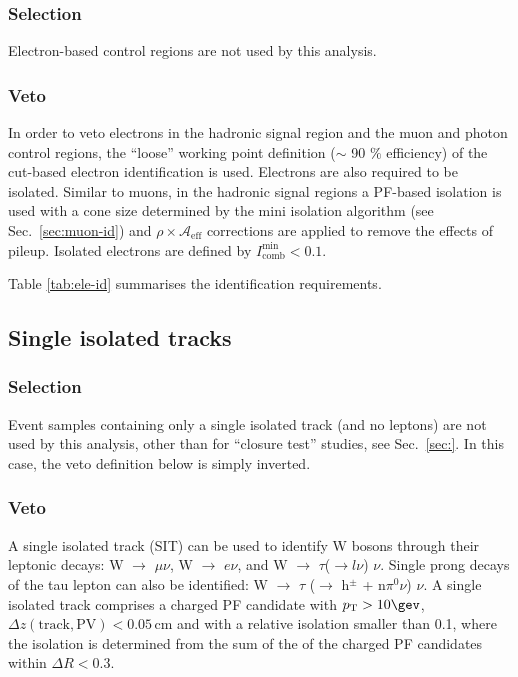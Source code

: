 \subsubsection{Selection}

Electron-based control regions are not used by this analysis. 

\subsubsection{Veto}

In order to veto electrons in the hadronic signal region and the muon
and photon control regions, the ``loose'' working point definition
($\sim$ 90 $\%$ efficiency) of the cut-based electron identification
\cite{electron-id} is used.  Electrons are also required to be
isolated.  Similar to muons, in the hadronic signal regions a PF-based
isolation \cite{pf-photon} is used with a cone size determined by the
mini isolation algorithm (see Sec.~\ref{sec:muon-id}) and $\rho\times
\mathcal{A}_\textrm{eff}$ corrections are applied to remove the effects of pileup.
Isolated electrons are defined by $I^\mathrm{min}_\mathrm{comb} < 0.1$.

Table \ref{tab:ele-id} summarises the identification requirements. 

\subsection{Single isolated tracks}
\label{sec:SIT}

\subsubsection{Selection}

Event samples containing only a single isolated track (and no leptons)
are not used by this analysis, other than for ``closure test''
studies, see Sec.~\ref{sec:}. In this case, the veto definition below
is simply inverted.

\subsubsection{Veto}

A single isolated track (SIT) can be used to identify W bosons through
their leptonic decays: W $\rightarrow$ $\mu \nu$, W $\rightarrow$
$e\nu$, and W $\rightarrow$ $\tau$($\rightarrow l\nu$) $\nu$.  Single
prong decays of the tau lepton can also be identified: W $\rightarrow$
$\tau$ ($\rightarrow$ h$^{\pm}$ + n$\pi^{0}\nu$) $\nu$.  A single
isolated track comprises a charged PF candidate with $\Pt > 10 \gev$,
$\Delta z(\mathrm{track}, \mathrm{PV}) < 0.05 \, \mathrm{cm}$ and with
a relative isolation smaller than 0.1, where the isolation is
determined from the sum of the \Pt of the charged PF candidates within
$\Delta R < 0.3$.

